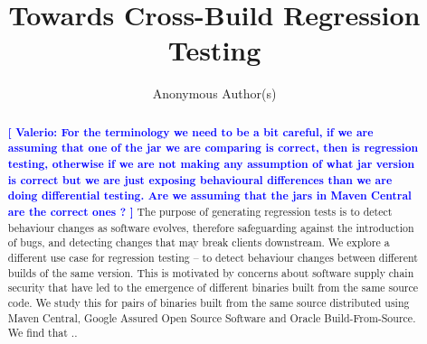 \documentclass[conference]{IEEEtran}
\newcommand{\valerio}[1]{\textbf{\textcolor{blue}{[ \ding{46}Valerio: #1]}}}
\newcommand{\inputgen}[1]{\unskip}
\begin{document}
\title{Towards Cross-Build Regression Testing}


\author{Anonymous Author(s)}

\maketitle

\begin{abstract}
\valerio{For the terminology we need to be a bit careful, if we are assuming that one of the jar we are comparing is correct, then is regression testing, otherwise if we are not making any assumption of what jar version is correct but we are just exposing behavioural differences than we are doing differential testing. Are we assuming that the jars in Maven Central are the correct ones ?  }
The purpose of generating regression tests is to detect behaviour changes as software evolves, therefore safeguarding against the introduction of bugs, and detecting changes that may break  clients downstream. We explore a different use case for regression testing – to detect behaviour changes  between different builds of the same version. This is motivated by concerns about software supply chain security that have led to the emergence of different binaries built from the same source code. We study this for \inputgen{num-pairs-of-binaries} pairs of binaries built from the same source distributed using Maven Central, Google Assured Open Source Software and Oracle Build-From-Source. 
We find that ..

\end{abstract}
\end{document}
